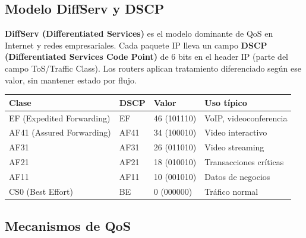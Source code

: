 \subsection{Modelo DiffServ y DSCP}

\begin{concepto}
\textbf{DiffServ (Differentiated Services)} es el modelo dominante de QoS en Internet
y redes empresariales. Cada paquete IP lleva un campo \textbf{DSCP (Differentiated
Services Code Point)} de 6 bits en el header IP (parte del campo ToS/Traffic Class).
Los routers aplican tratamiento diferenciado según ese valor, sin mantener estado
por flujo.
\end{concepto}

\begin{center}
\begin{tabular}{llll}
\toprule
\textbf{Clase} & \textbf{DSCP} & \textbf{Valor} & \textbf{Uso típico} \\
\midrule
EF (Expedited Forwarding)   & EF   & 46 (101110) & VoIP, videoconferencia \\
AF41 (Assured Forwarding)   & AF41 & 34 (100010) & Video interactivo \\
AF31                         & AF31 & 26 (011010) & Video streaming \\
AF21                         & AF21 & 18 (010010) & Transacciones críticas \\
AF11                         & AF11 & 10 (001010) & Datos de negocios \\
CS0 (Best Effort)            & BE   &  0 (000000) & Tráfico normal \\
\bottomrule
\end{tabular}
\end{center}

\subsection{Mecanismos de QoS}

